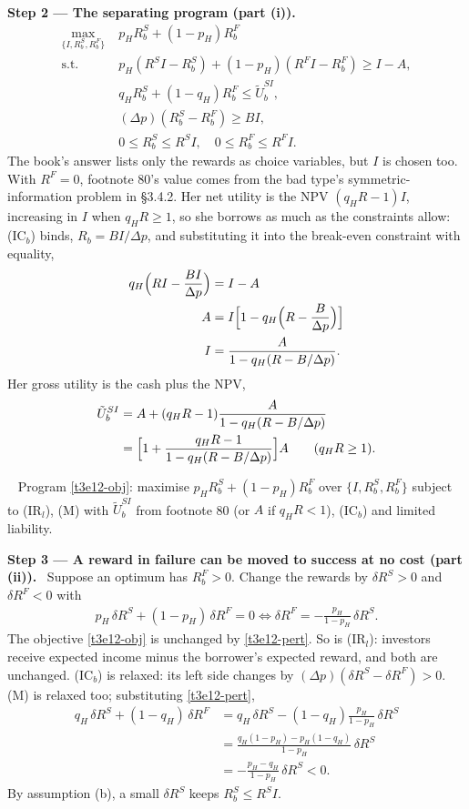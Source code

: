 \documentclass[11pt,a4paper]{article}
\newcommand{\step}[2]{\par\medskip\noindent\textbf{Step #1 --- #2.}~}
\newcommand{\answer}[1]{\par\smallskip\noindent\fbox{\textbf{Answer #1.}}~}
\begin{document}
\step{2}{The separating program (part (i))}
\begin{align}
  \max_{\{I,R_b^S,R_b^F\}}\;& p_HR_b^S+(1-p_H)R_b^F \label{t3e12-obj}\\
  \text{s.t.}\;& p_H(R^SI-R_b^S)+(1-p_H)(R^FI-R_b^F)\ge I-A, \tag{IR$_l$}\\
  & q_HR_b^S+(1-q_H)R_b^F\le\tilde U_b^{SI}, \tag{M}\\
  & (\Delta p)(R_b^S-R_b^F)\ge BI, \tag{IC$_b$}\\
  & 0\le R_b^S\le R^SI,\quad 0\le R_b^F\le R^FI. \nonumber
\end{align}
The book's answer lists only the rewards as choice variables, but $I$ is chosen too. With $R^F=0$,
footnote 80's value comes from the bad type's symmetric-information problem in \S3.4.2. Her net utility is the NPV $(q_HR-1)I$, increasing in $I$ when $q_HR\ge1$, so she borrows as much as the constraints allow: (IC$_b$) binds, $R_b=BI/\Delta p$, and substituting it into the break-even constraint with equality,
\begin{align}
  q_H\Bigl(RI-\frac{BI}{\Delta p}\Bigr) &= I-A \nonumber\\
  A &= I\Bigl[1-q_H\Bigl(R-\frac{B}{\Delta p}\Bigr)\Bigr] \nonumber\\
  I &= \frac{A}{1-q_H(R-B/\Delta p)}. \nonumber
\end{align}
Her gross utility is the cash plus the NPV,
\begin{align}
  \tilde U_b^{SI} &= A+(q_HR-1)\frac{A}{1-q_H(R-B/\Delta p)} \nonumber\\
  &= \Bigl[1+\frac{q_HR-1}{1-q_H(R-B/\Delta p)}\Bigr]A \qquad (q_HR\ge1). \label{t3e12-USI}
\end{align}

\answer{(i)} Program \eqref{t3e12-obj}: maximise $p_HR_b^S+(1-p_H)R_b^F$ over $\{I,R_b^S,R_b^F\}$ subject to (IR$_l$), (M) with $\tilde U_b^{SI}$ from footnote 80 (or $A$ if $q_HR<1$), (IC$_b$) and limited liability.

\step{3}{A reward in failure can be moved to success at no cost (part (ii))} Suppose an optimum has
$R_b^F>0$. Change the rewards by $\delta R^S>0$ and $\delta R^F<0$ with
\begin{align}
  p_H\,\delta R^S+(1-p_H)\,\delta R^F = 0
  \iff \delta R^F = -\frac{p_H}{1-p_H}\,\delta R^S. \label{t3e12-pert}
\end{align}
The objective \eqref{t3e12-obj} is unchanged by \eqref{t3e12-pert}. So is (IR$_l$): investors receive
expected income minus the borrower's expected reward, and both are unchanged. (IC$_b$) is relaxed:
its left side changes by $(\Delta p)(\delta R^S-\delta R^F)>0$. (M) is relaxed too; substituting
\eqref{t3e12-pert},
\begin{align}
  q_H\,\delta R^S+(1-q_H)\,\delta R^F
  &= q_H\,\delta R^S-(1-q_H)\frac{p_H}{1-p_H}\,\delta R^S \nonumber\\
  &= \frac{q_H(1-p_H)-p_H(1-q_H)}{1-p_H}\,\delta R^S \nonumber\\
  &= -\frac{p_H-q_H}{1-p_H}\,\delta R^S < 0. \label{t3e12-dM}
\end{align}
By assumption (b), a small $\delta R^S$ keeps $R_b^S\le R^SI$.
\end{document}

